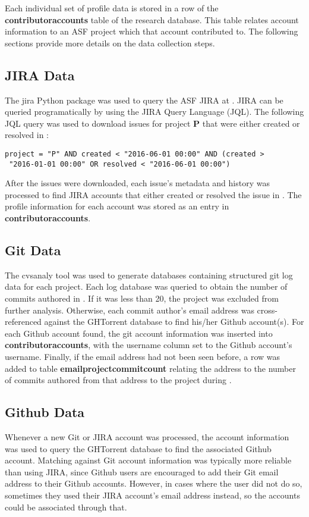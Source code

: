 Each individual set of profile data is stored in a row of the \textbf{contributoraccounts} table of the research database. This table relates account information to an ASF project which that account contributed to. The following sections provide more details on the data collection steps.

\subsection{JIRA Data}
 
The jira Python package was used to query the ASF JIRA at \ASFJIRAURL. JIRA can be queried programatically by using the JIRA Query Language (JQL). The following JQL query was used to download issues for project \textbf{P} that were either created or resolved in \timeperiod:
\begin{lstlisting}
project = "P" AND created < "2016-06-01 00:00" AND (created >
 "2016-01-01 00:00" OR resolved < "2016-06-01 00:00")
\end{lstlisting}
After the issues were downloaded, each issue's metadata and history was processed to find JIRA accounts that either created or resolved the issue in \timeperiod. The profile information for each account was stored as an entry in \textbf{contributoraccounts}.
\subsection{Git Data}
The cvsanaly tool was used to generate databases containing structured git log data for each project. Each log database was queried to obtain the number of commits authored in \timeperiod. If it was less than 20, the project was excluded from further analysis. Otherwise, each commit author's email address was cross-referenced against the GHTorrent database to find his/her Github account(s). For each Github account found, the git account information was inserted into \textbf{contributoraccounts}, with the username column set to the Github account's username. Finally, if the email address had not been seen before, a row was added to table \textbf{emailprojectcommitcount} relating the address to the number of commits authored from that address to the project during \timeperiod.
\subsection{Github Data}
Whenever a new Git or JIRA account was processed, the account information was used to query the GHTorrent database to find the associated Github account. Matching against Git account information was typically more reliable than using JIRA, since Github users are encouraged to add their Git email address to their Github accounts. However, in cases where the user did not do so, sometimes they used their JIRA account's email address instead, so the accounts could be associated through that.

